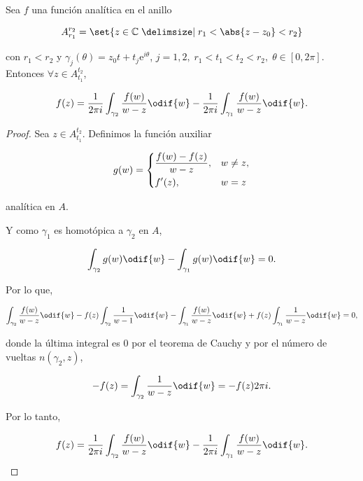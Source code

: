 \documentclass[../main.tex]{subfiles}
\begin{document}
\begin{lemma}
    Sea \(f\) una función analítica en el anillo

    \begin{equation*}
        A_{r_{1}}^{r_{2}} = \set{z\in \mathbb{C} \given r_{1} < \abs{z - z_{0}} < r_{2}}
    \end{equation*}

    con \(r_{1} < r_{2}\) y \(\gamma_{j}(\theta) = z_{0}t +
    t_{j}\mathrm{e}^{i\theta}\), \(j = {1, 2},\; r_{1} < t_{1} < t_{2} <
    r_{2},\; \theta\in [0, 2\pi]\). Entonces \(\forall z\in A_{t_{1}}^{t_{2}}\),

    \begin{equation*}
        f(z) = \dfrac{1}{2\pi i}\int_{\gamma_{2}}^{}\dfrac{f(w)}{w - z}\odif{w} -
        \dfrac{1}{2\pi i}\int_{\gamma_{1}}^{}\dfrac{f(w)}{w - z}\odif{w}.
    \end{equation*}
\end{lemma}

\begin{proof}
    Sea \(z\in A_{t_{1}}^{t_{2}}\).
    Definimos la función auxiliar

    \begin{equation*}
        g(w) =
        \begin{dcases}
            \dfrac{f(w) - f(z)}{w - z}, & w \neq z,\\
            f^{\prime}(z), & w = z
        \end{dcases}
    \end{equation*}

    analítica en \(A\).

    Y como \(\gamma_{1}\) es homotópica a \(\gamma_{2}\) en \(A\),

    \begin{equation*}
        \int_{\gamma_{2}}^{}g(w)\odif{w} - \int_{\gamma_{1}}^{}g(w)\odif{w} = 0.
    \end{equation*}

    Por lo que,

    \begin{equation*}
        \int_{\gamma_{2}}^{}\dfrac{f(w)}{w - z}\odif{w} -
        f(z)\int_{\gamma_{2}}^{}\dfrac{1}{w
        - 1}\odif{w} - \int_{\gamma_{1}}^{}\dfrac{f(w)}{w - z}\odif{w} + f(z)
        \int_{\gamma_{1}}^{}\dfrac{1}{w - z}\odif{w} = 0,
    \end{equation*}

    donde la última integral es \(0\) por el teorema de Cauchy y por el
    número de vueltas
    \(n(\gamma_{2}, z)\),

    \begin{equation*}
        -f(z) = \int_{\gamma_{2}}^{}\dfrac{1}{w - z}\odif{w} = -f(z)2\pi i.
    \end{equation*}

    Por lo tanto,

    \begin{equation*}
        f(z) = \dfrac{1}{2\pi i}\int_{\gamma_{2}}^{}\dfrac{f(w)}{w - z}\odif{w} -
        \dfrac{1}{2\pi i}\int_{\gamma_{1}}^{}\dfrac{f(w)}{w - z}\odif{w}.
    \end{equation*}
\end{proof}
\end{document}
